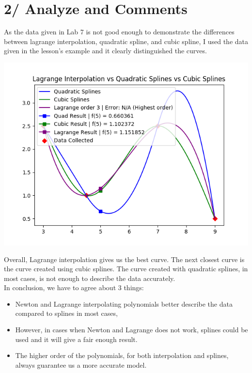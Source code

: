 \documentclass[12pt]{article}
\begin{document}
  \part*{2/ Analyze and Comments}
    As the data given in Lab 7 is not good enough to demonstrate the differences between lagrange interpolation, quadratic spline, and
  cubic spline, I used the data given in the lesson's example and it clearly distinguished the curves. \\
    \begin{center}
      \includegraphics{Result1.png}
    \end{center}
    Overall, Lagrange interpolation gives us the best curve.
    The next closest curve is the curve created using cubic splines.
    The curve created with quadratic splines, in most cases, is not enough to describe the data accurately. \\
    In conclusion, we have to agree about 3 things:
    \begin{itemize}
      \item Newton and Lagrange interpolating polynomials better describe the data compared to splines in most cases,
      \item However, in cases when Newton and Lagrange does not work, splines could be used and it will give a fair enough result.
      \item The higher order of the polynomials, for both interpolation and splines, always guarantee us a more accurate model.
    \end{itemize}
  
\end{document}
